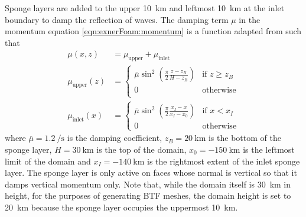 Sponge layers are added to the upper \SI{10}{\kilo\meter} and leftmost \SI{10}{\kilo\meter} at the inlet boundary to damp the reflection of waves.
The damping term \(\mu\) in the momentum equation \eqref{eqn:exnerFoam:momentum} is a function adapted from \citet{melvin2010} such that
\begin{subequations}
\begin{align}
	\mu(x, z) &= \mu_\mathrm{upper} + \mu_\mathrm{inlet} \\
	\mu_\mathrm{upper}(z) &= \begin{cases}
		\overline{\mu} \sin^2 \left( \frac{\pi}{2} \frac{z - z_B}{H - z_B} \right) & \text{if } z \geq z_B \\
		0 & \text{otherwise} \\
	\end{cases} \\
	\mu_\mathrm{inlet}(x) &= \begin{cases}
		\overline{\mu} \sin^2 \left( \frac{\pi}{2} \frac{x_I - x}{x_I - x_0} \right) & \text{if } x < x_I \\
		0 & \text{otherwise}
	\end{cases}
\end{align}
\end{subequations}
where $\overline{\mu} = \SI{1.2}{\per\second}$ is the damping coefficient, $z_B = \SI{20}{\kilo\meter}$ is the bottom of the sponge layer, $H = \SI{30}{\kilo\meter}$ is the top of the domain, $x_0 = \SI{-150}{\kilo\meter}$ is the leftmost limit of the domain and $x_I = \SI{-140}{\kilo\meter}$ is the rightmost extent of the inlet sponge layer.
The sponge layer is only active on faces whose normal is vertical so that it damps vertical momentum only.
Note that, while the domain itself is \SI{30}{\kilo\meter} in height, for the purposes of generating BTF meshes, the domain height is set to \SI{20}{\kilo\meter} because the sponge layer occupies the uppermost \SI{10}{\kilo\meter}.

